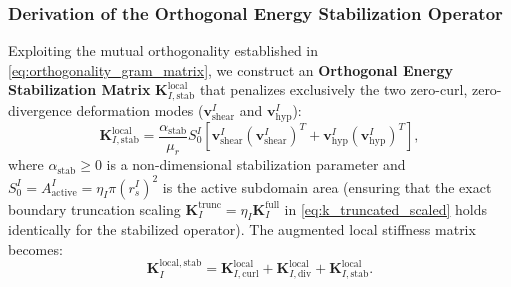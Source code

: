 \documentclass[preprint,12pt]{elsarticle}
\begin{document}
\subsubsection{Derivation of the Orthogonal Energy Stabilization Operator}
\label{subsubsec:derivation_orthogonal_stabilization}

Exploiting the mutual orthogonality established in \eqref{eq:orthogonality_gram_matrix}, we construct an \textbf{Orthogonal Energy Stabilization Matrix} $\mathbf{K}_{I, \mathrm{stab}}^{\mathrm{local}}$ that penalizes exclusively the two zero-curl, zero-divergence deformation modes ($\mathbf{v}_{\mathrm{shear}}^I$ and $\mathbf{v}_{\mathrm{hyp}}^I$):
\begin{equation}
    \mathbf{K}_{I, \mathrm{stab}}^{\mathrm{local}} = \frac{\alpha_{\mathrm{stab}}}{\mu_r} S_0^I \left[ \mathbf{v}_{\mathrm{shear}}^I (\mathbf{v}_{\mathrm{shear}}^I)^T + \mathbf{v}_{\mathrm{hyp}}^I (\mathbf{v}_{\mathrm{hyp}}^I)^T \right],
    \label{eq:k_stab_analytic}
\end{equation}
where $\alpha_{\mathrm{stab}} \ge 0$ is a non-dimensional stabilization parameter and $S_0^I = A_{\mathrm{active}}^I = \eta_I \pi (r_s^I)^2$ is the active subdomain area (ensuring that the exact boundary truncation scaling $\mathbf{K}_I^{\mathrm{trunc}} = \eta_I \mathbf{K}_I^{\mathrm{full}}$ in \eqref{eq:k_truncated_scaled} holds identically for the stabilized operator). The augmented local stiffness matrix becomes:
\begin{equation}
    \mathbf{K}_I^{\mathrm{local, stab}} = \mathbf{K}_{I, \mathrm{curl}}^{\mathrm{local}} + \mathbf{K}_{I, \mathrm{div}}^{\mathrm{local}} + \mathbf{K}_{I, \mathrm{stab}}^{\mathrm{local}}.
    \label{eq:k_augmented_local}
\end{equation}
\end{document}
